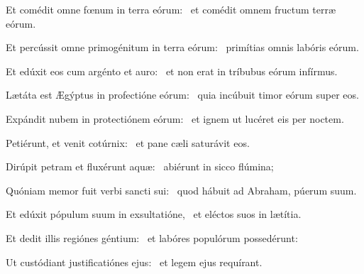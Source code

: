 \item Et comédit omne fœnum in terra eórum:~\psstar{} et comédit omnem fructum terræ eórum.

\item Et percússit omne primogénitum in terra eórum:~\psstar{} primítias omnis labóris eórum.

\item Et edúxit eos cum argénto et auro:~\psstar{} et non erat in tríbubus eórum infírmus.

\item Lætáta est Ægýptus in profectióne eórum:~\psstar{} quia incúbuit timor eórum super eos.

\item Expándit nubem in protectiónem eórum:~\psstar{} et ignem ut lucéret eis per noctem.

\item Petiérunt, et venit cotúrnix:~\psstar{} et pane cæli saturávit eos.

\item Dirúpit petram et fluxérunt aquæ:~\psstar{} abiérunt in sicco flúmina;

\item Quóniam memor fuit verbi sancti sui:~\psstar{} quod hábuit ad Abraham, púerum suum.

\item Et edúxit pópulum suum in exsultatióne,~\psstar{} et eléctos suos in lætítia.

\item Et dedit illis regiónes géntium:~\psstar{} et labóres populórum possedérunt:

\item Ut custódiant justificatiónes ejus:~\psstar{} et legem ejus requírant.